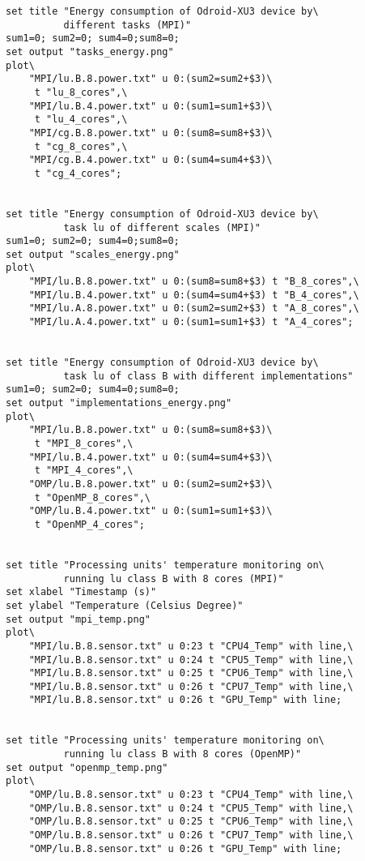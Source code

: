 \begin{lstlisting}[label=lst:draw.p, caption={draw.p}]
set title "Energy consumption of Odroid-XU3 device by\
          different tasks (MPI)"
sum1=0; sum2=0; sum4=0;sum8=0;
set output "tasks_energy.png"
plot\
    "MPI/lu.B.8.power.txt" u 0:(sum2=sum2+$3)\
     t "lu_8_cores",\
    "MPI/lu.B.4.power.txt" u 0:(sum1=sum1+$3)\
     t "lu_4_cores",\
    "MPI/cg.B.8.power.txt" u 0:(sum8=sum8+$3)\
     t "cg_8_cores",\
    "MPI/cg.B.4.power.txt" u 0:(sum4=sum4+$3)\
     t "cg_4_cores";


set title "Energy consumption of Odroid-XU3 device by\
          task lu of different scales (MPI)"
sum1=0; sum2=0; sum4=0;sum8=0;
set output "scales_energy.png"
plot\
    "MPI/lu.B.8.power.txt" u 0:(sum8=sum8+$3) t "B_8_cores",\
    "MPI/lu.B.4.power.txt" u 0:(sum4=sum4+$3) t "B_4_cores",\
    "MPI/lu.A.8.power.txt" u 0:(sum2=sum2+$3) t "A_8_cores",\
    "MPI/lu.A.4.power.txt" u 0:(sum1=sum1+$3) t "A_4_cores";
    

set title "Energy consumption of Odroid-XU3 device by\
          task lu of class B with different implementations"
sum1=0; sum2=0; sum4=0;sum8=0;
set output "implementations_energy.png"
plot\
    "MPI/lu.B.8.power.txt" u 0:(sum8=sum8+$3)\
     t "MPI_8_cores",\
    "MPI/lu.B.4.power.txt" u 0:(sum4=sum4+$3)\
     t "MPI_4_cores",\
    "OMP/lu.B.8.power.txt" u 0:(sum2=sum2+$3)\
     t "OpenMP_8_cores",\
    "OMP/lu.B.4.power.txt" u 0:(sum1=sum1+$3)\
     t "OpenMP_4_cores";


set title "Processing units' temperature monitoring on\
          running lu class B with 8 cores (MPI)"
set xlabel "Timestamp (s)"
set ylabel "Temperature (Celsius Degree)"
set output "mpi_temp.png"
plot\
    "MPI/lu.B.8.sensor.txt" u 0:23 t "CPU4_Temp" with line,\
    "MPI/lu.B.8.sensor.txt" u 0:24 t "CPU5_Temp" with line,\
    "MPI/lu.B.8.sensor.txt" u 0:25 t "CPU6_Temp" with line,\
    "MPI/lu.B.8.sensor.txt" u 0:26 t "CPU7_Temp" with line,\
    "MPI/lu.B.8.sensor.txt" u 0:26 t "GPU_Temp" with line;


set title "Processing units' temperature monitoring on\
          running lu class B with 8 cores (OpenMP)"
set output "openmp_temp.png"
plot\
    "OMP/lu.B.8.sensor.txt" u 0:23 t "CPU4_Temp" with line,\
    "OMP/lu.B.8.sensor.txt" u 0:24 t "CPU5_Temp" with line,\
    "OMP/lu.B.8.sensor.txt" u 0:25 t "CPU6_Temp" with line,\
    "OMP/lu.B.8.sensor.txt" u 0:26 t "CPU7_Temp" with line,\
    "OMP/lu.B.8.sensor.txt" u 0:26 t "GPU_Temp" with line;
\end{lstlisting}
